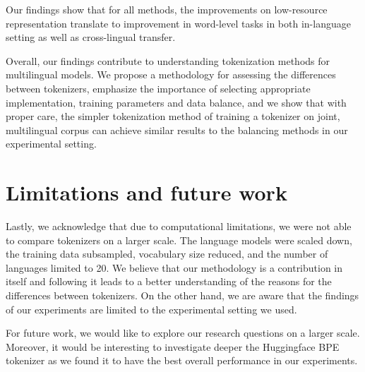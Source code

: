 Our findings show that for all methods, the improvements on low-resource representation translate to improvement in word-level tasks in both in-language setting as well as cross-lingual transfer. 

Overall, our findings contribute to understanding tokenization methods for multilingual models. We propose a methodology for assessing the differences between tokenizers, emphasize the importance of selecting appropriate implementation, training parameters and data balance, and we show that with proper care, the simpler tokenization method of training a tokenizer on joint, multilingual corpus can achieve similar results to the balancing methods in our experimental setting.

\section{Limitations and future work}

Lastly, we acknowledge that due to computational limitations, we were not able to compare tokenizers on a larger scale. The language models were scaled down, the training data subsampled, vocabulary size reduced, and the number of languages limited to 20. We believe that our methodology is a contribution in itself and following it leads to a better understanding of the reasons for the differences between tokenizers. On the other hand, we are aware that the findings of our experiments are limited to the experimental setting we used. 

For future work, we would like to explore our research questions on a larger scale. Moreover, it would be interesting to investigate deeper the Huggingface BPE tokenizer as we found it to have the best overall performance in our experiments.


